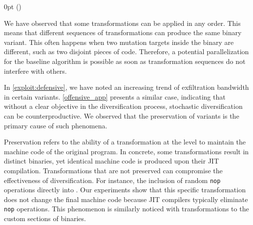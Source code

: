 
\def\checkmark{\tikz\fill[scale=0.4](0,.35) -- (.25,0) -- (1,.7) -- (.25,.15) -- cycle;} 

  {\topsep}%
  {\topsep}%
  {\itshape}%
  {0pt}%
  {\bfseries}%
  {}%
  { }%
  {()\textnormal{}}

\def\Gnospace~{G{}}
\theoremstyle{sota}
\newtheorem{goal}{G}
\providecommand*{\definitionautorefname}{\Gnospace}
\newcommand{\goalautorefname}{\Gnospace}


\def\Snospace~{S{}}
\theoremstyle{sota}
\newtheorem{strategy}{S}
\providecommand*{\definitionautorefname}{\Snospace}
\newcommand{\strategyautorefname}{\Snospace}

\def\Unospace~{U{}}
\theoremstyle{sota}
\newtheorem{usage}{U}
\providecommand*{\definitionautorefname}{\Unospace}
\newcommand{\usageautorefname}{\Unospace}

We have observed that some transformations can be applied in any order. 
This means that different sequences of transformations can produce the same binary variant. 
This often happens when two mutation targets inside the binary are different, such as two disjoint pieces of code.
Therefore, a potential parallelization for the baseline algorithm is possible as soon as transformation sequences do not interfere with others.



\label{exploit:discussion_bad}

In \autoref{exploit:defensive}, we have noted an increasing trend of exfiltration bandwidth in certain variants. 
\autoref{offensive_app} presents a similar case, indicating that without a clear objective in the diversification process, stochastic diversification can be counterproductive. 
We observed that the preservation of variants is the primary cause of such phenomena. 

Preservation refers to the ability of a transformation at the \Wasm level to maintain the machine code of the original \Wasm program.
In concrete, some transformations result in distinct \Wasm binaries, yet identical machine code is produced upon their JIT compilation.
Transformations that are not preserved can compromise the effectiveness of diversification.
For instance, the inclusion of random \texttt{nop} operations directly into \Wasm. 
Our experiments show that this specific transformation does not change the final machine code because JIT compilers typically eliminate \texttt{nop} operations.
This phenomenon is similarly noticed with transformations to the custom sections of \Wasm binaries.

